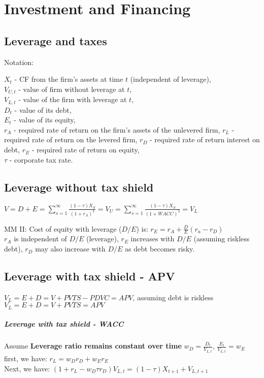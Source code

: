 \section{Investment and Financing}

\subsection*{Leverage and taxes}

Notation: 

$X_t$ - CF from the firm’s assets at time $t$ (independent of leverage), \\
$V_{U,t}$ - value of firm without leverage at $t$, \\
$V_{L,t}$ - value of the firm with leverage at $t$, \\
$D_t$ - value of its debt, \\
$E_t$ - value of its equity, \\
$r_A$ - required rate of return on the firm's assets of the unlevered firm,
$r_L$ - required rate of return on the levered firm,
$r_D$ - required rate of return interest on debt,
$r_E$ - required rate of return on equity, \\
$\tau$ - corporate tax rate.

\subsection*{Leverage without tax shield}

$V = D+E = \sum_{s=1}^{\infty} \frac{(1-\tau)X_S}{(1+r_A)^2} =V_U =\sum_{s=1}^{\infty} \frac{(1-\tau)X_S}{(1+WACC)^2} =V_L$

MM II: Cost of equity with leverage ($D/E$) is:
$r_E=r_A+\frac{D}{E}(r_a-r_D)$ \\
$r_A$ is independent of $D/E$ (leverage),
$r_E$ increases with $D/E$ (assuming riskless debt),
$r_D$ may also increase with $D/E$ as debt becomes risky.


\subsection*{Leverage with tax shield - APV}

$V_L = E+D = V+PVTS-PDVC = APV$, assuming debt is riskless $V_L = E+D = V+PVTS = APV$

\subparagraph*{Leverage with tax shield - WACC}
Assume {\bf Leverage ratio remains constant over time} $w_D = \frac{D_t}{V_{L,t}}$, $\frac{E_t}{V_{L,t}}=w_E$ \\
first, we have: 
$r_L = w_D r_D + w_E r_E$ \\
Next, we have: 
$(1 + r_L - w_D\tau r_D) V_{L,t}=(1-\tau) X_{t+1} + V_{L,t+1}$ \\

